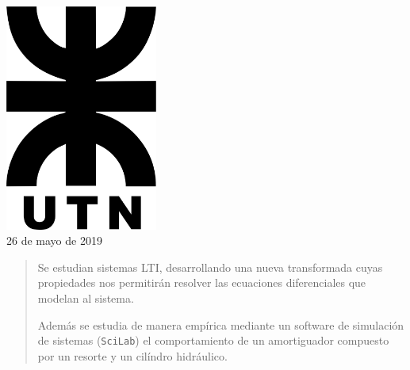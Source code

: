 \documentclass[12pt]{article}
\begin{document}
\begin{titlepage}
\begin{center}





\includegraphics[width=5cm]{./logos/logo_utn.png}\\[1cm] 				%
 {\large 26 de mayo de 2019}											%

\newpage %
\end{center}

\begin{abstract}
Se estudian sistemas LTI, desarrollando una nueva transformada cuyas propiedades nos permitirán resolver las ecuaciones diferenciales que modelan al sistema.

Además se estudia de manera empírica mediante un software de simulación de sistemas (\texttt{SciLab}) el comportamiento de un amortiguador compuesto por un resorte y un cilíndro hidráulico.
\end{abstract}


\tableofcontents\vspace{2.5cm}
\thispagestyle{empty}
\end{titlepage}
\newpage
\pagestyle{fancy}
\end{document}

